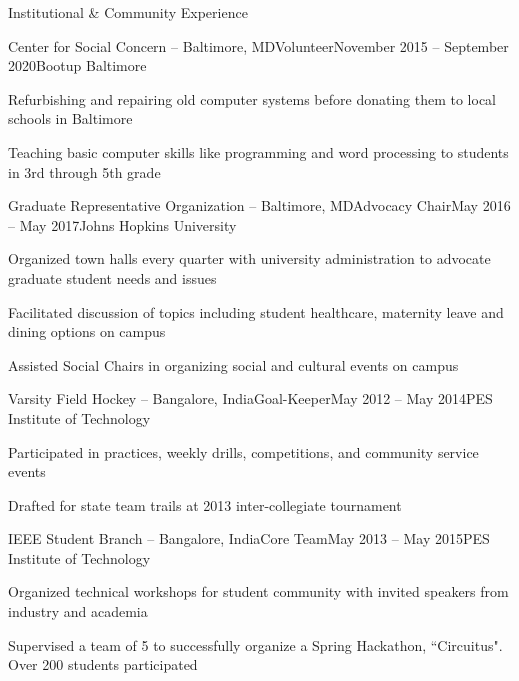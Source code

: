 \documentclass{resume}
\begin{document}
  \begin{rSection}{Institutional \& Community Experience}
\begin{rSubsection}{Center for Social Concern -- Baltimore, MD}{}{Volunteer}{November 2015 -- September 2020}{Bootup Baltimore}
\item Refurbishing and repairing old computer systems before donating them to local schools in Baltimore
\item Teaching basic computer skills like programming and word processing to students in 3rd through 5th grade 
    \end{rSubsection}
          \begin{rSubsection}{Graduate Representative Organization -- Baltimore, MD}{}{Advocacy Chair}{May 2016 -- May 2017}{Johns Hopkins University}
\item Organized town halls every quarter with university administration to advocate graduate student needs and issues
\item Facilitated discussion of topics including student healthcare, maternity leave and dining options on campus
\item Assisted Social Chairs in organizing social and cultural events on campus
    \end{rSubsection}

\begin{rSubsection}{Varsity Field Hockey -- Bangalore, India}{}{Goal-Keeper}{May 2012 -- May 2014}{PES Institute of Technology}
\item Participated in practices, weekly drills, competitions, and community service events
\item Drafted for state team trails at 2013 inter-collegiate tournament 
    \end{rSubsection}

\begin{rSubsection}{IEEE Student Branch -- Bangalore, India}{}{Core Team}{May 2013 -- May 2015}{PES Institute of Technology}
\item Organized technical workshops for student community with invited speakers from industry and academia
\item Supervised a team of 5 to successfully organize a Spring Hackathon, ``Circuitus". Over 200 students participated
    \end{rSubsection}
  \end{rSection}   
  
\end{document}
